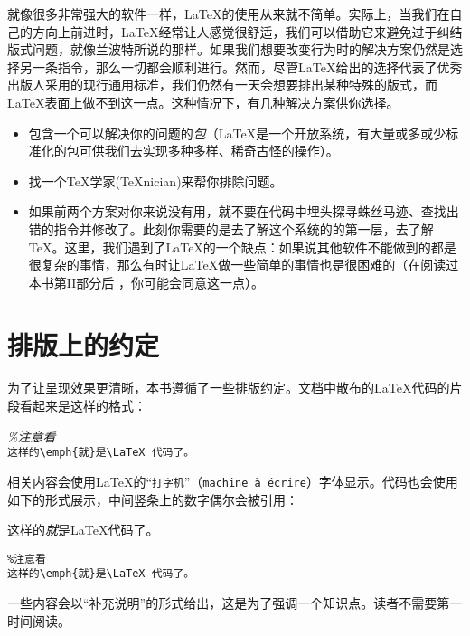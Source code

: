 就像很多非常强大的软件一样，\LaTeX 的使用从来就不简单。实际上，当我们在自己的方向上前进时，\LaTeX 经常让人感觉很舒适，我们可以借助它来避免过于纠结版式问题，就像兰波特所说的那样。如果我们想要改变行为时的解决方案仍然是选择另一条指令，那么一切都会顺利进行。然而，尽管\LaTeX 给出的选择代表了优秀出版人采用的现行通用标准，我们仍然有一天会想要排出某种特殊的版式，而\LaTeX 表面上做不到这一点。这种情况下，有几种解决方案供你选择。
\begin{itemize}
    \item 包含一个可以解决你的问题的\emph{包}（\LaTeX 是一个开放系统，有大量或多或少标准化的包可供我们去实现多种多样、稀奇古怪的操作）。
    \item 找一个\TeX 学家(\TeX nician)来帮你排除问题。
    \item 如果前两个方案对你来说没有用，就不要在代码中埋头探寻蛛丝马迹、查找出错的指令并修改了。此刻你需要的是去了解这个系统的的第一层，去了解\TeX 。这里，我们遇到了\LaTeX 的一个缺点：如果说其他软件不能做到的都是很复杂的事情，那么有时让\LaTeX 做一些简单的事情也是很困难的（在阅读过本书第II部分后%
    ，你可能会同意这一点）。
\end{itemize}

\section*{排版上的约定}

为了让呈现效果更清晰，本书遵循了一些排版约定。文档中散布的\LaTeX 代码的片段看起来是这样的格式：

\begin{dmd}
\textsl{\%注意看}\\
\verb+这样的\emph{就}是\LaTeX 代码了。+
\end{dmd}

相关内容会使用\LaTeX 的“\texttt{打字机}”（\texttt{machine à écrire}）字体显示。代码也会使用如下的形式展示，中间竖条上的数字偶尔会被引用：

\begin{codelist}[0.1]{
    这样的\emph{就}是\LaTeX 代码了。
}
\begin{verbatim}
%注意看
这样的\emph{就}是\LaTeX 代码了。\end{verbatim}
\end{codelist}

\begin{ii}
一些内容会以“补充说明”的形式给出，这是为了强调一个知识点。读者不需要第一时间阅读。
\end{ii}

